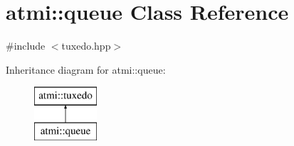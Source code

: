 \hypertarget{classatmi_1_1queue}{}\section{atmi\+:\+:queue Class Reference}
\label{classatmi_1_1queue}


{\ttfamily \#include $<$tuxedo.\+hpp$>$}

Inheritance diagram for atmi\+:\+:queue\+:\begin{figure}[H]
\begin{center}
\leavevmode
\includegraphics[height=2.000000cm]{classatmi_1_1queue}
\end{center}
\end{figure}
